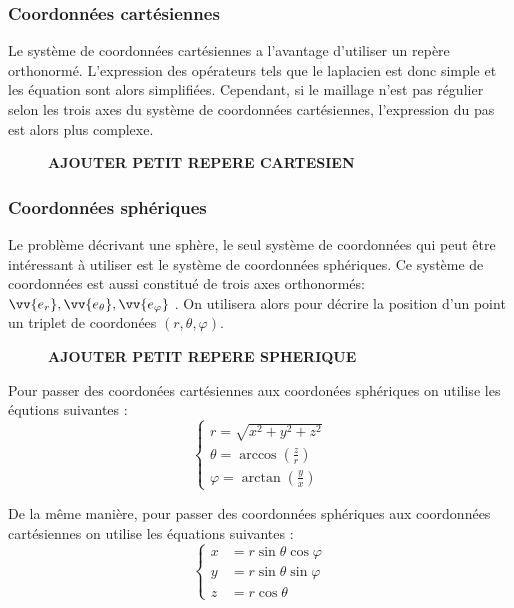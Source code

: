 \documentclass[fleqn]{article}
\renewcommand{\phi}{\varphi}
\begin{document}
\subsubsection{Coordonnées cartésiennes}
Le système de coordonnées cartésiennes a l'avantage d'utiliser un repère orthonormé. L'expression des opérateurs tels que le laplacien est donc simple et les équation sont alors simplifiées. Cependant, si le maillage n'est pas régulier selon les trois axes du système de coordonnées cartésiennes, l'expression du pas est alors plus complexe.

\begin{figure}[H]
    \centering
    \textbf{AJOUTER PETIT REPERE CARTESIEN}
\end{figure}

\subsubsection{Coordonnées sphériques}
Le problème décrivant une sphère, le seul système de coordonnées qui peut être intéressant à utiliser est le système de coordonnées sphériques. Ce système de coordonnées est aussi constitué de trois axes orthonormés:$\vv{e_r}, \vv{e_\theta}, \vv{e_\phi}$ . On utilisera alors pour décrire la position d'un point un triplet de coordonées $(r, \theta, \phi)$. 

\begin{figure}[H]
    \centering
    \textbf{AJOUTER PETIT REPERE SPHERIQUE}
\end{figure}


Pour passer des coordonées cartésiennes aux coordonées sphériques on utilise les équtions suivantes :
\begin{equation}
    \begin{cases}
        r = \sqrt{x^2 + y^2 + z^2} \\
        \theta = \arccos \left( \frac{z}{r} \right)\\
        \phi = \arctan \left( \frac{y}{x} \right)
    \end{cases}
\end{equation}

De la même manière, pour passer des coordonnées sphériques aux coordonnées cartésiennes on utilise les équations suivantes :
\begin{equation}
    \begin{cases}
        x&=r \sin \theta \cos \varphi \\y&=r \sin \theta \sin \varphi \\z&=r \cos \theta 
    \end{cases}
\end{equation}
\end{document}
